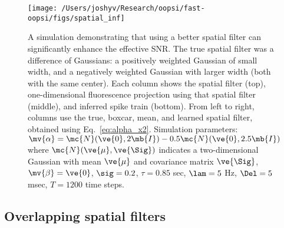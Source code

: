 \begin{figure}[h!]
\centering \texttt{[image: /Users/joshyv/Research/oopsi/fast-oopsi/figs/spatial\_inf]}
\caption[spatial filtering can improve effective SNR]{A simulation demonstrating that using a better spatial filter can significantly enhance the effective SNR. The true spatial filter was a difference of Gaussians: a positively weighted Gaussian of small width, and a negatively weighted Gaussian with larger width (both with the same center).  Each column shows the spatial filter (top), one-dimensional fluorescence projection using that spatial filter (middle), and inferred spike train (bottom).  From left to right, columns use the true, boxcar, mean, and learned spatial filter, obtained using Eq.~\eqref{eq:alpha_x2}. Simulation parameters: $\mv{\alpha}=\mc{N}(\ve{0},2 \mb{I})-0.5 \mc{N}(\ve{0},2.5 \mb{I})$ where $\mc{N}(\ve{\mu},\ve{\Sig})$ indicates a two-dimensional Gaussian with mean $\ve{\mu}$ and covariance matrix $\ve{\Sig}$, $\mv{\beta}=\ve{0}$, $\sig=0.2$, $\tau=0.85$ sec, $\lam=5$ Hz, $\Del=5$ msec, $T=1200$ time steps.} \label{fig:spatial} 
\end{figure}



\subsection{Overlapping spatial filters} \label{sec:results:overlapping}


